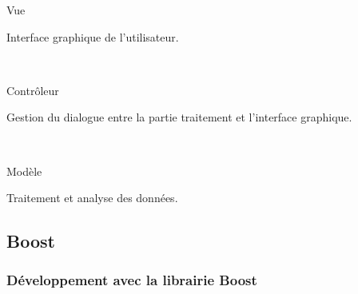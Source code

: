{\begin{minipage}{0.45\textwidth}
\begin{flushright}
\begin{block}{Vue}
\begin{center}
Interface graphique de l'utilisateur.
\end{center}
\end{block}
~\\
\begin{block}{Contrôleur}
\begin{center}
Gestion du dialogue entre la partie traitement et l'interface graphique.
\end{center}
\end{block}
~\\
\begin{block}{Modèle}
\begin{center}
Traitement et analyse des données.
\end{center}
\end{block}
\end{flushright}
\end{minipage}
}

\subsection{Boost}
\frame
{
\frametitle{D\'eveloppement avec la librairie Boost}


}
